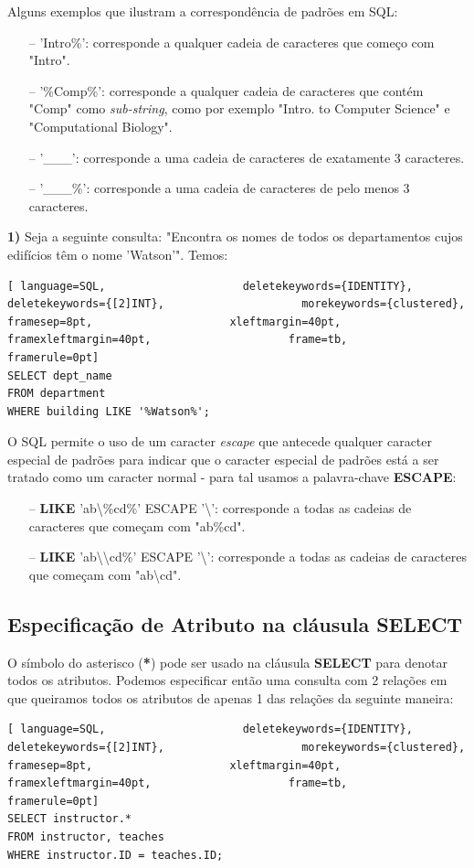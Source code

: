 \documentclass[oneside]{book}
\theoremstyle{definition}
\begin{document}
Alguns exemplos que ilustram a correspondência de padrões em SQL:
\begin{itemize}
    \itemsep0cm
    \item[--]'Intro\%': corresponde a qualquer cadeia de caracteres que começo com "Intro".
    \item[--]'\%Comp\%': corresponde a qualquer cadeia de caracteres que contém "Comp" como \textit{sub-string}, como por exemplo "Intro. to Computer Science" e "Computational Biology".
    \item[--]'\_\_\_': corresponde a uma cadeia de caracteres de exatamente 3 caracteres.
    \item[--]'\_\_\_\%': corresponde a uma cadeia de caracteres de pelo menos 3 caracteres.
\end{itemize}

\textbf{1)} Seja a seguinte consulta: "Encontra os nomes de todos os departamentos cujos edifícios têm o nome 'Watson'". Temos:
\begin{lstlisting}[ language=SQL,                     deletekeywords={IDENTITY},                     deletekeywords={[2]INT},                     morekeywords={clustered},                     framesep=8pt,                     xleftmargin=40pt,                     framexleftmargin=40pt,                     frame=tb,                     framerule=0pt]
SELECT dept_name
FROM department
WHERE building LIKE '%Watson%';
\end{lstlisting}

O SQL permite o uso de um caracter \textit{escape} que antecede qualquer caracter especial de padrões para indicar que o caracter especial de padrões está a ser tratado como um caracter normal - para tal usamos a palavra-chave \textbf{ESCAPE}:
\begin{itemize}
    \itemsep0cm
    \item[--]\textbf{LIKE} 'ab\textbackslash\%cd\%' ESCAPE '\textbackslash': corresponde a todas as cadeias de caracteres que começam com "ab\%cd".
    \item[--]\textbf{LIKE} 'ab\textbackslash \textbackslash cd\%' ESCAPE '\textbackslash': corresponde a todas as cadeias de caracteres que começam com "ab\textbackslash cd".
\end{itemize}

\subsection{Especificação de Atributo na cláusula SELECT}
O símbolo do asterisco (\textbf{*}) pode ser usado na cláusula \textbf{SELECT} para denotar todos os atributos. Podemos especificar então uma consulta com 2 relações em que queiramos todos os atributos de apenas 1 das relações da seguinte maneira:
\begin{lstlisting}[ language=SQL,                     deletekeywords={IDENTITY},                     deletekeywords={[2]INT},                     morekeywords={clustered},                     framesep=8pt,                     xleftmargin=40pt,                     framexleftmargin=40pt,                     frame=tb,                     framerule=0pt]
SELECT instructor.*
FROM instructor, teaches
WHERE instructor.ID = teaches.ID;
\end{lstlisting}
\end{document}
